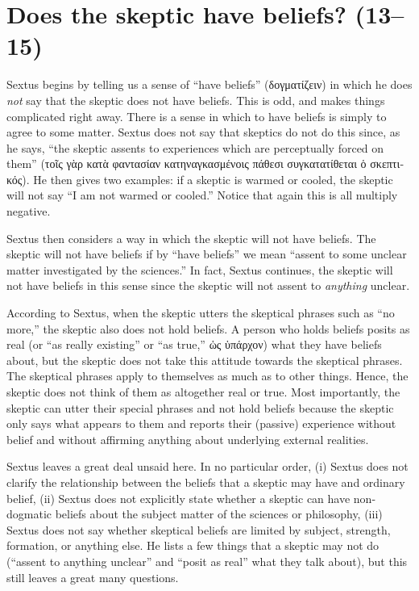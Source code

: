 \section*{Does the skeptic have beliefs? (13--15)}

Sextus begins by telling us a sense of ``have beliefs'' (\textgreek{δογματίζειν}) in which he does \textit{not} say that the skeptic does not have beliefs. This is odd, and makes things complicated right away. There is a sense in which to have beliefs is simply to agree to some matter. Sextus does not say that skeptics do not do this since, as he says, ``the skeptic assents to experiences which are perceptually forced on them'' (\textgreek{τοῖς γὰρ κατὰ φαντασίαν κατηναγκασμένοις πάθεσι συγκατατίθεται ὁ σκεπτικός}). He then gives two examples: if a skeptic is warmed or cooled, the skeptic will not say ``I am not warmed or cooled.'' Notice that again this is all multiply negative. 

Sextus then considers a way in which the skeptic will not have beliefs. The skeptic will not have beliefs if by ``have beliefs'' we mean ``assent to some unclear matter investigated by the sciences.'' In fact, Sextus continues, the skeptic will not have beliefs in this sense since the skeptic will not assent to \textit{anything} unclear.

According to Sextus, when the skeptic utters the skeptical phrases such as ``no more,'' the skeptic also does not hold beliefs. A person who holds beliefs posits as real (or ``as really existing'' or ``as true,'' \textgreek{ὡς ὑπάρχον}) what they have beliefs about, but the skeptic does not take this attitude towards the skeptical phrases. The skeptical phrases apply to themselves as much as to other things. Hence, the skeptic does not think of them as altogether real or true. Most importantly, the skeptic can utter their special phrases and not hold beliefs because the skeptic only says what appears to them and reports their (passive) experience without belief and without affirming anything about underlying external realities.

Sextus leaves a great deal unsaid here. In no particular order, (i) Sextus does not clarify the relationship between the beliefs that a skeptic may have and ordinary belief, (ii) Sextus does not explicitly state whether a skeptic can have non-dogmatic beliefs about the subject matter of the sciences or philosophy, (iii) Sextus does not say whether skeptical beliefs are limited by subject, strength, formation, or anything else. He lists a few things that a skeptic may not do (``assent to anything unclear'' and ``posit as real'' what they talk about), but this still leaves a great many questions.

